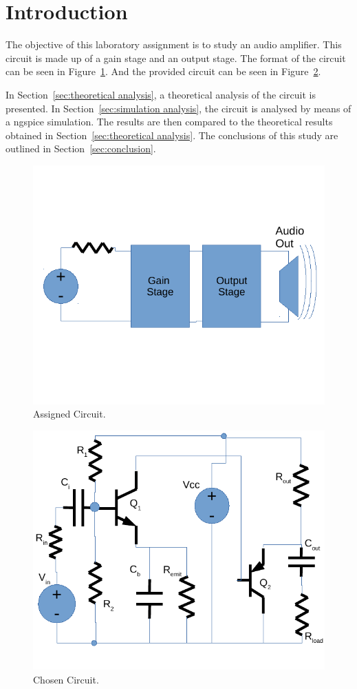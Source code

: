 \section{Introduction}
\label{sec:introduction}

\indent

The objective of this laboratory assignment is to study an audio amplifier.
This circuit is made up of a gain stage and an output stage.
The format of the circuit can be seen in Figure~\ref{fig:format}. And the  provided circuit can be seen in Figure~\ref{fig:circuit}.

In Section~\ref{sec:theoretical analysis}, a theoretical analysis of the circuit is
presented. In Section~\ref{sec:simulation analysis}, the circuit is analysed by
means of a ngspice simulation. The results are then compared to the theoretical results obtained in
Section~\ref{sec:theoretical analysis}. The conclusions of this study are outlined in
Section~\ref{sec:conclusion}.



\begin{figure}[h!] \centering
	\includegraphics[width=0.65\linewidth]{circ_enunciado.pdf}
	\caption{Assigned Circuit.}
	\label{fig:format}
\end{figure}

\begin{figure}[h!] \centering
	\includegraphics[width=0.6\linewidth]{circ.pdf}
	\caption{Chosen Circuit.}
	\label{fig:circuit}
\end{figure}



